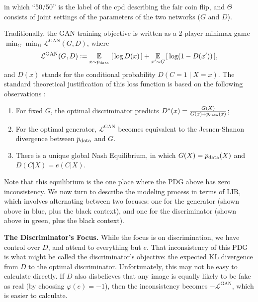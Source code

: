 in which ``50/50'' is the label of the cpd describing the fair coin flip, and $\Theta$ consists of joint settings of the parameters of the two networks ($G$ and $D$). 

Traditionally, the GAN training objective is written as a 2-player minimax game
$
    \min_{G} \min_{D}  \mathcal L^{\text{GAN}}(G,D)
$, where
\[
\mathcal L^{\text{GAN}}(G,D) := 
    \operatorname*{\mathbb{E}}_{\vphantom{|}x \sim p_{\mathrm{data}}}
    \;[\, \log D(x) \, ] + \operatorname*{\mathbb{E}}_{\vphantom{|} x' \sim G} \, [\,\log (1- D(x')) \,],
\]
and $D(x)$ stands for the conditional probability $D(C{=}1 \mid X={x})$. 
The standard theoretical justification of this loss function 
is based on the following observations \citep{goodfellow2020generative}:
\begin{enumerate}[nosep]
    \item For fixed $G$, the optimal discriminator predicts $D^*(x) = \frac{G(X)}{G(x) + p_{\mathrm{data}}(x)}$;
    \item For the optimal generator, $\mathcal L^{\text{GAN}}$ becomes equivalent to the Jesnen-Shanon divergence \citep{MENENDEZ1997307} between $p_{\mathrm{data}}$ and $G$.
    \item There is a unique global Nash Equilibrium, in which $G(X) = p_{\mathrm{data}}(X)$ and $D(C | X) = e(C|X)$. 
\end{enumerate}
Note that this equilibrium is the one place where the PDG above has zero inconsistency. 
We now turn to describe the modeling process in terms of LIR, which involves alternating between two focuses: one for the generator (shown above in blue, plus the black context), and one for the discriminator (shown above in green, plus the black context). 


\textbf{The Discriminator's Focus.}
While the focus is on discrimination, 
    we have control over $D$, and attend to
    everything but $e$.
That inconsistency of this PDG is what might be called
    the discriminator's objective:
    the expected KL divergence from $D$ to the optimal discriminator.
Unfortunately, this may not be easy to calculate directly. 
If $D$ also disbelieves that any image is equally likely to be fake as real
    (by choosing $\varphi(e) = -1$),
then the inconsistency becomes $-\mathcal L^{\text{GAN}}$, which is easier to calculate.

